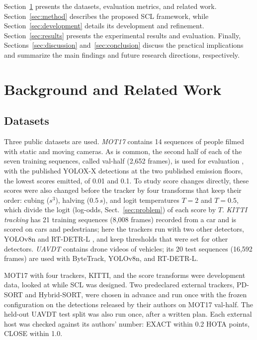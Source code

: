 \documentclass[pdflatex,sn-mathphys-num,iicol]{sn-jnl}
\newcommand{\scl}{SCL}
\begin{document}
Section~\ref{sec:related} presents the datasets, evaluation metrics, and related work.
Section~\ref{sec:method} describes the proposed \scl{} framework, while
Section~\ref{sec:development} details its development and refinement. Section~\ref{sec:results}
presents the experimental results and evaluation. Finally, Sections~\ref{sec:discussion}
and~\ref{sec:conclusion} discuss the practical implications and summarize the main findings and
future research directions, respectively.
\section{Background and Related Work}\label{sec:related}

\subsection{Datasets}\label{sec:data}
Three public datasets are used. \emph{MOT17} \cite{milan2016mot16} contains 14 sequences of
people filmed with static and moving cameras. As is common, the second half of each of the seven
training sequences, called val-half (2,652 frames), is used for evaluation \cite{zhang2022bytetrack},
with the published YOLOX-X detections \cite{ge2021yolox} at the two published emission floors, the
lowest scores emitted, of 0.01 and 0.1. To study score changes directly, these scores were also
changed before the tracker by four transforms that keep their order: cubing ($s^3$), halving
($0.5\,s$), and logit temperatures $T=2$ and $T=0.5$, which divide the logit (log-odds, Sect.~\ref{sec:problem}) of each score by $T$.
\emph{KITTI tracking} \cite{geiger2012kitti} has 21 training sequences (8,008 frames) recorded from
a car and is scored on cars and pedestrians; here the trackers run with two other detectors,
YOLOv8n \cite{jocher2023yolov8} and RT-DETR-L \cite{zhao2024rtdetr}, and keep thresholds that were
set for other detectors. \emph{UAVDT} \cite{du2018uavdt} contains drone videos of vehicles; its 20
test sequences (16,592 frames) are used with ByteTrack, YOLOv8n, and RT-DETR-L.

MOT17 with four trackers, KITTI, and the score transforms were development data, looked at while
\scl{} was designed. Two predeclared external trackers, PD-SORT and Hybrid-SORT, were chosen in
advance and run once with the frozen configuration on the detections released by their authors on
MOT17 val-half. The held-out UAVDT test split was also run once, after a written plan. Each
external host was checked against its authors' number: EXACT within 0.2 HOTA points, CLOSE within
1.0.
\end{document}

